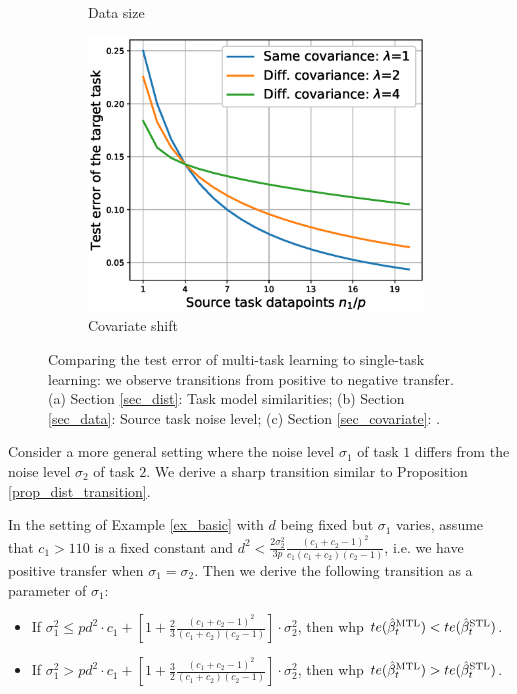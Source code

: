 \begin{figure}
\begin{subfigure}[b]{0.31\textwidth}
		\caption{Data size}
	\end{subfigure}\hfill
	\begin{subfigure}[b]{0.31\textwidth}
		\centering
		\includegraphics[width=0.98\textwidth]{figures/complementary.eps}
		\caption{Covariate shift}
	\end{subfigure}
	\caption{Comparing the test error of multi-task learning to single-task learning: we observe transitions from positive to negative transfer. (a) Section \ref{sec_dist}: Task model similarities; (b) Section \ref{sec_data}: Source task noise level; (c) Section \ref{sec_covariate}: .}
	\label{fig_model_shift_phasetrans}
\end{figure}


Consider a more general setting where the noise level $\sigma_1$ of task $1$ differs from the noise level $\sigma_2$ of task $2$.
We derive a sharp transition similar to Proposition \ref{prop_dist_transition}.

\begin{proposition}\label{prop_var_transition}
	In the setting of Example \ref{ex_basic} with $d$ being fixed but $\sigma_1$ varies, assume that $c_1 > 110$ is a fixed constant and $d^2 < \frac {2\sigma_2^2} {3p} \frac{(c_1 + c_2 -1)^2}{c_1 (c_1 + c_2)(c_2 - 1)}$, i.e. we have positive transfer when $\sigma_1=\sigma_2$. Then we derive the following transition as a parameter of $\sigma_1$:
	\begin{itemize}
		\item If $\sigma_1^2 \le p d^2 \cdot c_1 +\left[1+ \frac23\frac{(c_1 + c_2 - 1)^2}{(c_1 + c_2) (c_2 - 1)}\right]\cdot\sigma_2^2$, then whp $te(\hat{\beta}_t^{\text{MTL}}) < te(\hat{\beta}_t^{\text{STL}})$.
		\item If $\sigma_1^2 > p d^2 \cdot c_1 +\left[1+ \frac32\frac{(c_1 + c_2 - 1)^2}{(c_1 + c_2) (c_2 - 1)}\right] \cdot \sigma_2^2$, then whp $te(\hat{\beta}_t^{\text{MTL}}) > te(\hat{\beta}_t^{\text{STL}})$.
	\end{itemize}
\end{proposition}

